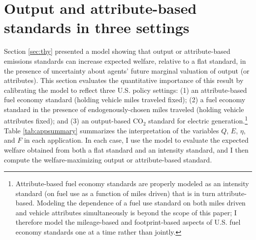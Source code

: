 \documentclass[12pt]{article}
\begin{document}
\section{Output and attribute-based standards in three settings} \label{sec:apps}

Section \ref{sec:thy} presented a model showing that output or attribute-based emissions standards can increase expected welfare, relative to a flat standard, in the presence of uncertainty about agents' future marginal valuation of output (or attributes). This section evaluates the quantitative importance of this result by calibrating the model to reflect three U.S. policy settings: (1) an attribute-based fuel economy standard (holding vehicle miles traveled fixed); (2) a fuel economy standard in the presence of endogenously-chosen miles traveled (holding vehicle attributes fixed); and (3) an output-based CO$_{\text{2}}$ standard for electric generation.\footnote{Attribute-based fuel economy standards are properly modeled as an intensity standard (on fuel use as a function of miles driven) that is in turn attribute-based. Modeling the dependence of a fuel use standard on both miles driven and vehicle attributes simultaneously is beyond the scope of this paper; I therefore model the mileage-based and footprint-based aspects of U.S. fuel economy standards one at a time rather than jointly.} Table \ref{tab:appsummary} summarizes the interpretation of the variables $Q$, $E$, $\eta$, and $F$ in each application. In each case, I use the model to evaluate the expected welfare obtained from both a flat standard and an intensity standard, and I then compute the welfare-maximizing output or attribute-based standard.
\end{document}
